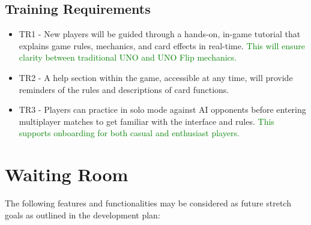 \documentclass[12pt]{article}
\newcommand{\added}[1]{\textcolor{green}{#1}}
\begin{document}
\subsection{Training Requirements}
\begin{itemize}
    \item TR1 - New players will be guided through a hands-on, in-game tutorial that explains game rules, mechanics, and card effects in real-time. \added{This will ensure clarity between traditional UNO and UNO Flip mechanics.}
    \item TR2 - A help section within the game, accessible at any time, will provide reminders of the rules and descriptions of card functions.
    \item TR3 - Players can practice in solo mode against AI opponents before entering multiplayer matches to get familiar with the interface and rules. \added{This supports onboarding for both casual and enthusiast players.}
\end{itemize}

\section{Waiting Room}
The following features and functionalities may be considered as future stretch goals as outlined in the development plan:
\end{document}
